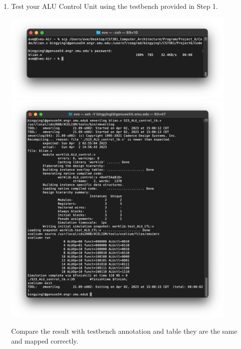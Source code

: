 \documentclass[12pt]{article}
\begin{document}
\begin{enumerate}
\begin{enumerate}
\begin{center}
        \end{center}
                \item Test your ALU Control Unit using the testbench provided in Step 1.
                                        \begin{center}
        \includegraphics[width=0.9\textwidth]{p4.png}
        \includegraphics[width=0.9\textwidth]{p5.png}
        \end{center}
        Compare the result with testbench annotation and table they are the same and mapped correctly.
        \begin{center}

\end{center}
\end{enumerate}
\end{enumerate}
\end{document}
